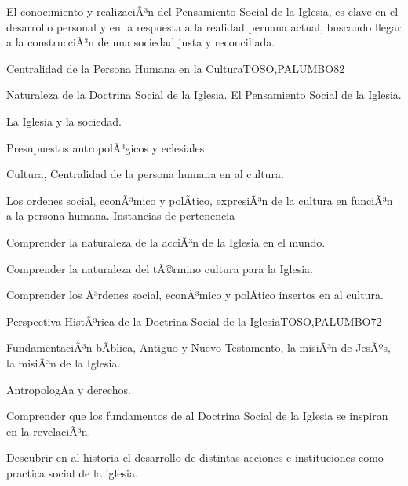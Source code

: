 \begin{syllabus}


\begin{justification}
El conocimiento y realizaciÃ³n del Pensamiento Social de la Iglesia, es clave en el desarrollo personal 
y en la respuesta a la realidad peruana actual, buscando llegar a la construcciÃ³n de una 
sociedad justa y reconciliada.
\end{justification}

\begin{goals}
\item \OutcomeFH
\end{goals}

\begin{outcomes}
\end{outcomes}

\begin{unit}{Centralidad de la Persona Humana en la Cultura}{TOSO,PALUMBO}{8}{2}
\begin{topics}
	\item Naturaleza de la Doctrina Social de la Iglesia.  El Pensamiento Social de la Iglesia.
	\item La Iglesia y la sociedad.
	\item Presupuestos antropolÃ³gicos y eclesiales
	\item Cultura, Centralidad de la persona humana en al cultura.
	\item Los ordenes social, econÃ³mico y polÃ­tico, expresiÃ³n de la cultura en funciÃ³n a la persona humana.  Instancias de pertenencia
\end{topics}
\begin{unitgoals}
	\item Comprender la naturaleza de la acciÃ³n de la Iglesia en el mundo.
	\item Comprender la naturaleza del tÃ©rmino cultura para la Iglesia.
	\item Comprender los Ã³rdenes social, econÃ³mico y polÃ­tico insertos en al cultura.
\end{unitgoals}
\end{unit}

\begin{unit}{Perspectiva HistÃ³rica de la Doctrina Social de la Iglesia}{TOSO,PALUMBO}{7}{2}
\begin{topics}
	\item FundamentaciÃ³n bÃ­blica, Antiguo y Nuevo Testamento, la misiÃ³n de JesÃºs, la misiÃ³n de la Iglesia.
	\item AntropologÃ­a y derechos.
\end{topics}
\begin{unitgoals}
	\item Comprender que los fundamentos de al Doctrina Social de la Iglesia se inspiran en la revelaciÃ³n.
	\item Descubrir en al historia el desarrollo de distintas acciones e instituciones como practica social de la iglesia.
\end{unitgoals}
\end{unit}


\end{syllabus}
